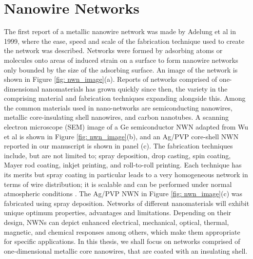 \begin{comment}
\fig{0.75}
{Images/Chapter1/density_of_states.jpg}
{\textbf{Sketch:} }
{sdfdsf.}
{fig: dos} 

In the case of 1-D and 2-D nanoparticles the extended dimensions are essentially infinite in comparison with the confined dimensions. Where the material has a lattice structure the physical properties of the nanopartical can be derived analytically by exploiting the periodicity of the lattice in the extended dimensions and the symmetry in the confined dimensions. For example the electronic density of states of carbon nanotubes and graphene have been calculated with excellent accuracy sining a tight-binding formalism and has been used to show the fascinating properties that can be shown in these materials. 
\end{comment}
\section{Nanowire Networks}
\label{Sec: Intro NWN}
The first report of a metallic nanowire network was made by Adelung et al\cite{adelung1999} in 1999, where the ease, speed and scale of the fabrication technique used to create the network was described. Networks were formed by adsorbing atoms or molecules onto areas of induced strain on a surface to form nanowire networks only bounded by the size of the adsorbing surface\cite{adelung1999}. An image of the network is shown in Figure \ref{fig: nwn_image}(a). Reports of networks comprised of one-dimensional nanomaterials has grown quickly since then, the variety in the comprising material and fabrication techniques expanding alongside this. Among the common materials used in nano-networks are semiconducting nanowires\cite{wu2002}, metallic core-insulating shell nanowires\cite{rathmell2010,chen2013,de2009}, and carbon nanotubes\cite{hu2004,aguirre2006,hecht2006}. A scanning electron microscope (SEM) image of a Ge semiconductor NWN adapted from Wu et al\cite{wu2002} is shown in Figure \ref{fig: nwn_image}(b), and an Ag/PVP core-shell NWN reported in our manuscript\cite{ocallaco2016} is shown in panel (c). The fabrication techniques include, but are not limited to; spray deposition\cite{tenent2009,lu2010,scardaci2011}, drop casting\cite{doherty2009}, spin coating\cite{leem2011}, Mayer rod coating\cite{liu2011}, inkjet printing\cite{finn2015}, and roll-to-roll printing\cite{kim2016}. Each technique has its merits but spray coating in particular leads to a very homogeneous network in terms of wire distribution; it is scalable and can be performed under normal atmospheric conditions \cite{langley2013}. The Ag/PVP NWN in Figure \ref{fig: nwn_image}(c) was fabricated using spray deposition\cite{ocallaco2016}. Networks of different nanomaterials will exhibit unique optimum properties, advantages and limitations. Depending on their design, NWNs can depict enhanced electrical, mechanical, optical, thermal, magnetic, and chemical responses\cite{liangbing2010,langley2014,song2013,wang2015,bobinger2017,sysoev2009} among others, which make them appropriate for specific applications. In this thesis, we shall focus on networks comprised of one-dimensional metallic core nanowires, that are coated with an insulating shell. 

